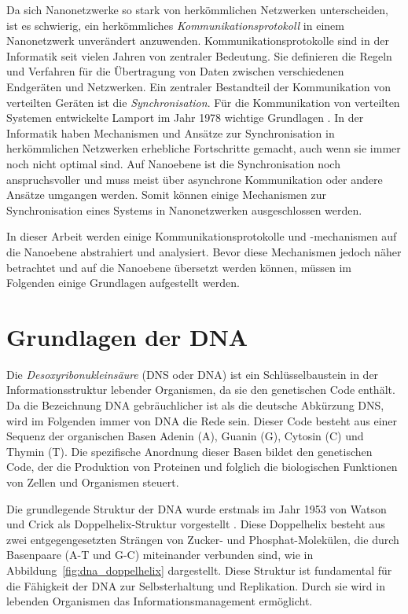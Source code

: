 Da sich Nanonetzwerke so stark von herkömmlichen Netzwerken unterscheiden, ist es schwierig, ein herkömmliches \emph{Kommunikationsprotokoll} in einem Nanonetzwerk unverändert anzuwenden.
Kommunikationsprotokolle sind in der Informatik seit vielen Jahren von zentraler Bedeutung. 
Sie definieren die Regeln und Verfahren für die Übertragung von Daten zwischen verschiedenen Endgeräten und Netzwerken. 
Ein zentraler Bestandteil der Kommunikation von verteilten Geräten ist die \emph{Synchronisation}. Für die Kommunikation von verteilten Systemen entwickelte Lamport im Jahr 1978 wichtige Grundlagen \cite{lamport1978time}. In der Informatik haben Mechanismen und Ansätze zur Synchronisation in herkömmlichen Netzwerken erhebliche Fortschritte gemacht, auch wenn sie immer noch nicht optimal sind. Auf Nanoebene ist die Synchronisation noch anspruchsvoller und muss meist über asynchrone Kommunikation oder andere Ansätze umgangen werden. Somit können einige Mechanismen zur Synchronisation eines Systems in Nanonetzwerken ausgeschlossen werden.\cite{buether2017formal}

In dieser Arbeit werden einige Kommunikationsprotokolle und -mechanismen auf die Nanoebene abstrahiert und analysiert. Bevor diese Mechanismen jedoch näher betrachtet und auf die Nanoebene übersetzt werden können, müssen im Folgenden einige Grundlagen aufgestellt werden.

\section{Grundlagen der DNA}
Die \emph{Desoxyribonukleinsäure} (DNS oder DNA) ist ein Schlüsselbaustein in der Informationsstruktur lebender Organismen, da sie den genetischen Code enthält. Da die Bezeichnung DNA gebräuchlicher ist als die deutsche Abkürzung DNS, wird im Folgenden immer von DNA die Rede sein. Dieser Code besteht aus einer Sequenz der organischen Basen Adenin (A), Guanin (G), Cytosin (C) und Thymin (T). Die spezifische Anordnung dieser Basen bildet den genetischen Code, der die Produktion von Proteinen und folglich die biologischen Funktionen von Zellen und Organismen steuert. \cite{alberts2015molecular}

Die grundlegende Struktur der DNA wurde erstmals im Jahr 1953 von Watson und Crick als Doppelhelix-Struktur vorgestellt \cite{watson1953molecular}. Diese Doppelhelix besteht aus zwei entgegengesetzten Strängen von Zucker- und Phosphat-Molekülen, die durch Basenpaare (A-T und G-C) miteinander verbunden sind, wie in Abbildung~\ref{fig:dna_doppelhelix} dargestellt. Diese Struktur ist fundamental für die Fähigkeit der DNA zur Selbsterhaltung und Replikation. Durch sie wird in lebenden Organismen das Informationsmanagement ermöglicht.

